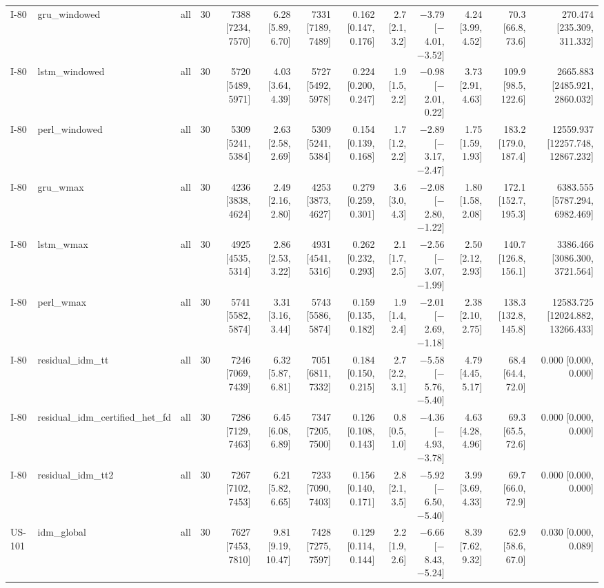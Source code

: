 \begin{table}[htbp]
{\begin{tabular}{lllrrrrrrrrrr}
I-80 & gru\_windowed & all & 30 & 7388 [7234, 7570] & 6.28 [5.89, 6.70] & 7331 [7189, 7489] & 0.162 [0.147, 0.176] & 2.7 [2.1, 3.2] & $-$3.79 [$-$4.01, $-$3.52] & 4.24 [3.99, 4.52] & 70.3 [66.8, 73.6] & 270.474 [235.309, 311.332] \\
I-80 & lstm\_windowed & all & 30 & 5720 [5489, 5971] & 4.03 [3.64, 4.39] & 5727 [5492, 5978] & 0.224 [0.200, 0.247] & 1.9 [1.5, 2.2] & $-$0.98 [$-$2.01, 0.22] & 3.73 [2.91, 4.63] & 109.9 [98.5, 122.6] & 2665.883 [2485.921, 2860.032] \\
I-80 & perl\_windowed & all & 30 & 5309 [5241, 5384] & 2.63 [2.58, 2.69] & 5309 [5241, 5384] & 0.154 [0.139, 0.168] & 1.7 [1.2, 2.2] & $-$2.89 [$-$3.17, $-$2.47] & 1.75 [1.59, 1.93] & 183.2 [179.0, 187.4] & 12559.937 [12257.748, 12867.232] \\
I-80 & gru\_wmax & all & 30 & 4236 [3838, 4624] & 2.49 [2.16, 2.80] & 4253 [3873, 4627] & 0.279 [0.259, 0.301] & 3.6 [3.0, 4.3] & $-$2.08 [$-$2.80, $-$1.22] & 1.80 [1.58, 2.08] & 172.1 [152.7, 195.3] & 6383.555 [5787.294, 6982.469] \\
I-80 & lstm\_wmax & all & 30 & 4925 [4535, 5314] & 2.86 [2.53, 3.22] & 4931 [4541, 5316] & 0.262 [0.232, 0.293] & 2.1 [1.7, 2.5] & $-$2.56 [$-$3.07, $-$1.99] & 2.50 [2.12, 2.93] & 140.7 [126.8, 156.1] & 3386.466 [3086.300, 3721.564] \\
I-80 & perl\_wmax & all & 30 & 5741 [5582, 5874] & 3.31 [3.16, 3.44] & 5743 [5586, 5874] & 0.159 [0.135, 0.182] & 1.9 [1.4, 2.4] & $-$2.01 [$-$2.69, $-$1.18] & 2.38 [2.10, 2.75] & 138.3 [132.8, 145.8] & 12583.725 [12024.882, 13266.433] \\
I-80 & residual\_idm\_tt & all & 30 & 7246 [7069, 7439] & 6.32 [5.87, 6.81] & 7051 [6811, 7332] & 0.184 [0.150, 0.215] & 2.7 [2.2, 3.1] & $-$5.58 [$-$5.76, $-$5.40] & 4.79 [4.45, 5.17] & 68.4 [64.4, 72.0] & 0.000 [0.000, 0.000] \\
I-80 & residual\_idm\_certified\_het\_fd & all & 30 & 7286 [7129, 7463] & 6.45 [6.08, 6.89] & 7347 [7205, 7500] & 0.126 [0.108, 0.143] & 0.8 [0.5, 1.0] & $-$4.36 [$-$4.93, $-$3.78] & 4.63 [4.28, 4.96] & 69.3 [65.5, 72.6] & 0.000 [0.000, 0.000] \\
I-80 & residual\_idm\_tt2 & all & 30 & 7267 [7102, 7453] & 6.21 [5.82, 6.65] & 7233 [7090, 7403] & 0.156 [0.140, 0.171] & 2.8 [2.1, 3.5] & $-$5.92 [$-$6.50, $-$5.40] & 3.99 [3.69, 4.33] & 69.7 [66.0, 72.9] & 0.000 [0.000, 0.000] \\
US-101 & idm\_global & all & 30 & 7627 [7453, 7810] & 9.81 [9.19, 10.47] & 7428 [7275, 7597] & 0.129 [0.114, 0.144] & 2.2 [1.9, 2.6] & $-$6.66 [$-$8.43, $-$5.24] & 8.39 [7.62, 9.32] & 62.9 [58.6, 67.0] & 0.030 [0.000, 0.089] \\

\end{tabular}}
\end{table}
